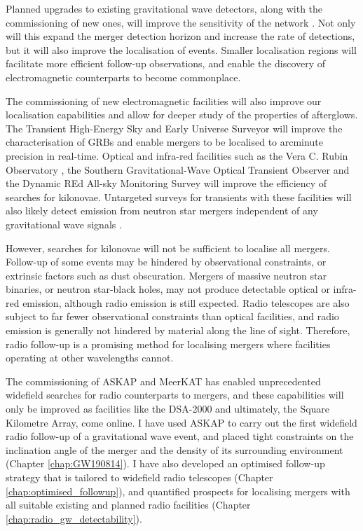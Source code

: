 \clearpage
\pagebreak

Planned upgrades to existing gravitational wave detectors, along with the commissioning of new ones, will improve the sensitivity of the network \citep{2018LRR....21....3A,2019CQGra..36v5002H}. Not only will this expand the merger detection horizon and increase the rate of detections, but it will also improve the localisation of events. Smaller localisation regions will facilitate more efficient follow-up observations, and enable the discovery of electromagnetic counterparts to become commonplace.

The commissioning of new electromagnetic facilities will also improve our localisation capabilities and allow for deeper study of the properties of afterglows. The Transient High-Energy Sky and Early Universe Surveyor \citep[THESEUS;][]{2018AdSpR..62..191A} will improve the characterisation of GRBs and enable mergers to be localised to arcminute precision in real-time. Optical and infra-red facilities such as the Vera C. Rubin Observatory \citep{2018arXiv181204051M}, the Southern Gravitational-Wave Optical Transient Observer \citep[GOTO;][]{2020MNRAS.497..726G} and the Dynamic REd All-sky Monitoring Survey \citep[DREAMS;][]{2020SPIE11203E..07S} will improve the efficiency of searches for kilonovae. Untargeted surveys for transients with these facilities will also likely detect emission from neutron star mergers independent of any gravitational wave signals \citep{2019PASP..131f8004A}.

However, searches for kilonovae will not be sufficient to localise all mergers. Follow-up of some events may be hindered by observational constraints, or extrinsic factors such as dust obscuration. Mergers of massive neutron star binaries, or neutron star-black holes, may not produce detectable optical or infra-red emission, although radio emission is still expected. Radio telescopes are also subject to far fewer observational constraints than optical facilities, and radio emission is generally not hindered by material along the line of sight. Therefore, radio follow-up is a promising method for localising mergers where facilities operating at other wavelengths cannot. %

The commissioning of ASKAP and MeerKAT has enabled unprecedented widefield searches for radio counterparts to mergers, and these capabilities will only be improved as facilities like the DSA-2000 and ultimately, the Square Kilometre Array, come online. I have used ASKAP to carry out the first widefield radio follow-up of a gravitational wave event, and placed tight constraints on the inclination angle of the merger and the density of its surrounding environment (Chapter \ref{chap:GW190814}). I have also developed an optimised follow-up strategy that is tailored to widefield radio telescopes (Chapter \ref{chap:optimised_followup}), and quantified prospects for localising mergers with all suitable existing and planned radio facilities (Chapter \ref{chap:radio_gw_detectability}).

